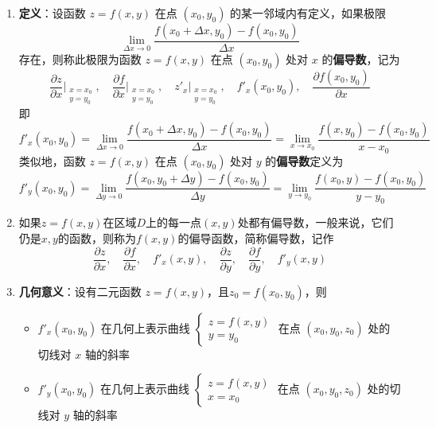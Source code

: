 \documentclass[../book.tex]{subfiles}
\begin{document}
    \begin{enumerate}
        \item \textbf{定义}：设函数 $z = f(x,y)$ 在点 $(x_0, y_0)$ 的某一邻域内有定义，如果极限
        \[
            \lim_{\Delta x \to 0} \frac{f(x_0 + \Delta x, y_0) - f(x_0, y_0)}{\Delta x}
        \]
        存在，则称此极限为函数 $z = f(x,y)$ 在点 $(x_0,y_0)$ 处对 $x$ 的\textbf{偏导数}，记为
        \[
            \frac{\partial z}{\partial x}\bigg|_{\substack{x=x_0 \\ y=y_0}}, \quad \frac{\partial f}{\partial x}\bigg|_{\substack{x=x_0 \\ y=y_0}}, \quad z'_x\big|_{\substack{x=x_0 \\ y=y_0}}, \quad f'_x(x_0, y_0),  \quad \frac{\partial f(x_0, y_0)}{\partial x}
        \]
        即
        \[
            f'_x(x_0, y_0) = \lim_{\Delta x \to 0} \frac{f(x_0 + \Delta x, y_0) - f(x_0, y_0)}{\Delta x} = \lim\limits_{x\to x_0} \frac{f(x, y_0) - f(x_0, y_0)}{x - x_0}
        \]
        类似地，函数 $z = f(x,y)$ 在点 $(x_0,y_0)$ 处对 $y$ 的\textbf{偏导数}定义为
        \[
            f'_y(x_0, y_0) = \lim_{\Delta y \to 0} \frac{f(x_0, y_0 + \Delta y) - f(x_0, y_0)}{\Delta y} = \lim\limits_{y\to y_0} \frac{f(x_0, y) - f(x_0, y_0)}{y - y_0}
        \]
        \item 如果$z = f(x, y)$在区域$D$上的每一点$(x , y)$处都有偏导数，一般来说，它们仍是$x, y$的函数，则称为$f(x, y)$的偏导函数，简称偏导数，记作
        \[
            \frac{\partial z}{\partial x}, \quad \frac{\partial f}{\partial x}, \quad f'_x(x, y), \quad \frac{\partial z}{\partial y}, \quad \frac{\partial f}{\partial y}, \quad f'_y(x, y)
        \]

        \item \textbf{几何意义}：设有二元函数 $z = f(x, y)$，且$z_0 = f(x_0, y_0)$，则
        \begin{itemize}
            \item $f'_x(x_0, y_0)$ 在几何上表示曲线 $\begin{cases}
                                                         z = f(x,y) \\ y = y_0
            \end{cases}$ 在点 $(x_0, y_0, z_0)$ 处的切线对 $x$ 轴的斜率
            \item $f'_y(x_0, y_0)$ 在几何上表示曲线 $\begin{cases}
                                                         z = f(x,y) \\ x = x_0
            \end{cases}$ 在点 $(x_0, y_0, z_0)$ 处的切线对 $y$ 轴的斜率
        \end{itemize}


\end{enumerate}
\end{document}
